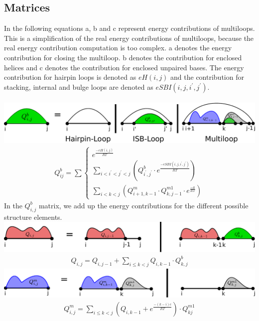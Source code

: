 \documentclass[11pt,a4paper]{report}
\begin{document}
\subsection*{Matrices}
In the following equations a, b and c represent energy contributions of multiloops. This is a simplification of the real energy contributions of multiloops, because the real energy contribution computation is too complex. a denotes the energy contribution for closing the multiloop. b denotes the contribution for enclosed helices and c denotes the contribution for enclosed unpaired bases. The energy contribution for hairpin loops is denoted as $eH(i,j)$ and the contribution for stacking, internal and bulge loops are denoted as $eSBI(i,j,i^\prime,j^\prime)$.\\\\
\includegraphics[scale=0.65]{QB.pdf}\\
\begin{align}
Q_{ij}^b = \sum \begin{cases}
					e^{\frac{-eH(i,j)}{RT}}\\
					\sum\limits_{i<i^{\prime} <j^{\prime} <j}(Q_{i^{\prime}, j^{\prime}}^b \cdot e^{\frac{-eSBI(i,j,i^{\prime},j^{\prime})}{RT}})\\
					\sum\limits_{i < k < j} (Q_{i+1,k-1}^m \cdot Q_{k, j-1}^{m1} \cdot e^{\frac{-a}{RT}})
				\end{cases}
\end{align}
In the $Q_{i,j}^b$ matrix, we add up the energy contributions for the different possible structure elements.\\
\includegraphics[scale=0.65]{Q.pdf}
\begin{align}
Q_{i,j} = Q_{i,j-1}+ \sum\limits_{i \leq k < j} Q_{i,k-1}\cdot Q_{k,j}^b
\end{align}
\includegraphics[scale=0.65]{QM.pdf}
\begin{align} \label{eq:1}
Q_{i,j}^m = \sum\limits_{i\leq k < j} (Q_{i,k-1} + e^{\frac{-(k-i)c}{RT}}) \cdot Q_{kj}^{m1}
\end{align}
\end{document}
